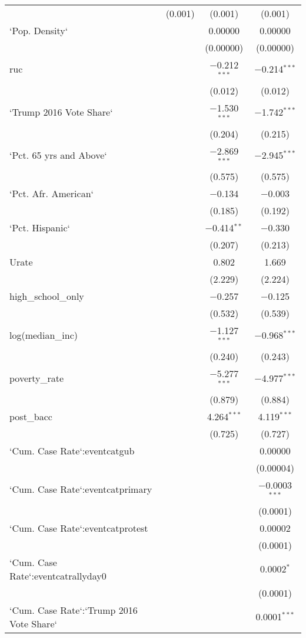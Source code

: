 \begin{table}[!htbp]
\begin{tabular}{@{\extracolsep{5pt}}lccc}
  & (0.001) & (0.001) & (0.001) \\ 
  `Pop. Density` &  & 0.00000 & 0.00000 \\ 
  &  & (0.00000) & (0.00000) \\ 
  ruc &  & $-$0.212$^{***}$ & $-$0.214$^{***}$ \\ 
  &  & (0.012) & (0.012) \\ 
  `Trump 2016 Vote Share` &  & $-$1.530$^{***}$ & $-$1.742$^{***}$ \\ 
  &  & (0.204) & (0.215) \\ 
  `Pct. 65 yrs and Above` &  & $-$2.869$^{***}$ & $-$2.945$^{***}$ \\ 
  &  & (0.575) & (0.575) \\ 
  `Pct. Afr. American` &  & $-$0.134 & $-$0.003 \\ 
  &  & (0.185) & (0.192) \\ 
  `Pct. Hispanic` &  & $-$0.414$^{**}$ & $-$0.330 \\ 
  &  & (0.207) & (0.213) \\ 
  Urate &  & 0.802 & 1.669 \\ 
  &  & (2.229) & (2.224) \\ 
  high\_school\_only &  & $-$0.257 & $-$0.125 \\ 
  &  & (0.532) & (0.539) \\ 
  log(median\_inc) &  & $-$1.127$^{***}$ & $-$0.968$^{***}$ \\ 
  &  & (0.240) & (0.243) \\ 
  poverty\_rate &  & $-$5.277$^{***}$ & $-$4.977$^{***}$ \\ 
  &  & (0.879) & (0.884) \\ 
  post\_bacc &  & 4.264$^{***}$ & 4.119$^{***}$ \\ 
  &  & (0.725) & (0.727) \\ 
  `Cum. Case Rate`:eventcatgub &  &  & 0.00000 \\ 
  &  &  & (0.00004) \\ 
  `Cum. Case Rate`:eventcatprimary &  &  & $-$0.0003$^{***}$ \\ 
  &  &  & (0.0001) \\ 
  `Cum. Case Rate`:eventcatprotest &  &  & 0.00002 \\ 
  &  &  & (0.0001) \\ 
  `Cum. Case Rate`:eventcatrallyday0 &  &  & 0.0002$^{*}$ \\ 
  &  &  & (0.0001) \\ 
  `Cum. Case Rate`:`Trump 2016 Vote Share` &  &  & 0.0001$^{***}$ \\ 

\end{tabular}
\end{table}
